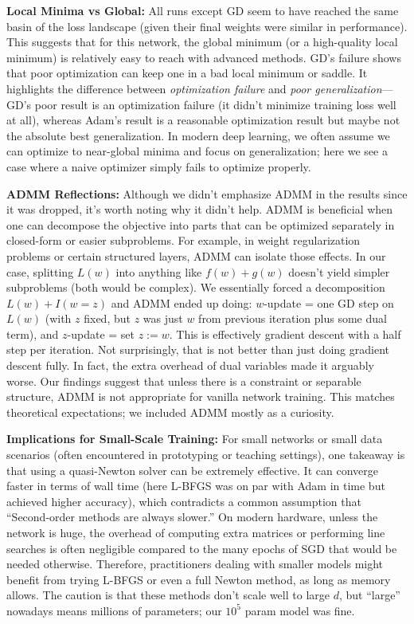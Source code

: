 \documentclass[12pt]{article}
\begin{document}
\textbf{Local Minima vs Global:} All runs except GD seem to have reached the same basin of the loss landscape (given their final weights were similar in performance). This suggests that for this network, the global minimum (or a high-quality local minimum) is relatively easy to reach with advanced methods. GD’s failure shows that poor optimization can keep one in a bad local minimum or saddle. It highlights the difference between \emph{optimization failure} and \emph{poor generalization}—GD’s poor result is an optimization failure (it didn’t minimize training loss well at all), whereas Adam’s result is a reasonable optimization result but maybe not the absolute best generalization. In modern deep learning, we often assume we can optimize to near-global minima and focus on generalization; here we see a case where a naive optimizer simply fails to optimize properly.

\textbf{ADMM Reflections:} Although we didn’t emphasize ADMM in the results since it was dropped, it’s worth noting why it didn’t help. ADMM is beneficial when one can decompose the objective into parts that can be optimized separately in closed-form or easier subproblems. For example, in weight regularization problems or certain structured layers, ADMM can isolate those effects. In our case, splitting $L(w)$ into anything like $f(w) + g(w)$ doesn’t yield simpler subproblems (both would be complex). We essentially forced a decomposition $L(w) + I(w=z)$ and ADMM ended up doing: $w$-update = one GD step on $L(w)$ (with $z$ fixed, but $z$ was just $w$ from previous iteration plus some dual term), and $z$-update = set $z := w$. This is effectively gradient descent with a half step per iteration. Not surprisingly, that is not better than just doing gradient descent fully. In fact, the extra overhead of dual variables made it arguably worse. Our findings suggest that unless there is a constraint or separable structure, ADMM is not appropriate for vanilla network training. This matches theoretical expectations; we included ADMM mostly as a curiosity.

\textbf{Implications for Small-Scale Training:} For small networks or small data scenarios (often encountered in prototyping or teaching settings), one takeaway is that using a quasi-Newton solver can be extremely effective. It can converge faster in terms of wall time (here L-BFGS was on par with Adam in time but achieved higher accuracy), which contradicts a common assumption that “Second-order methods are always slower.” On modern hardware, unless the network is huge, the overhead of computing extra matrices or performing line searches is often negligible compared to the many epochs of SGD that would be needed otherwise. Therefore, practitioners dealing with smaller models might benefit from trying L-BFGS or even a full Newton method, as long as memory allows. The caution is that these methods don’t scale well to large $d$, but “large” nowadays means millions of parameters; our $10^5$ param model was fine.
\end{document}

